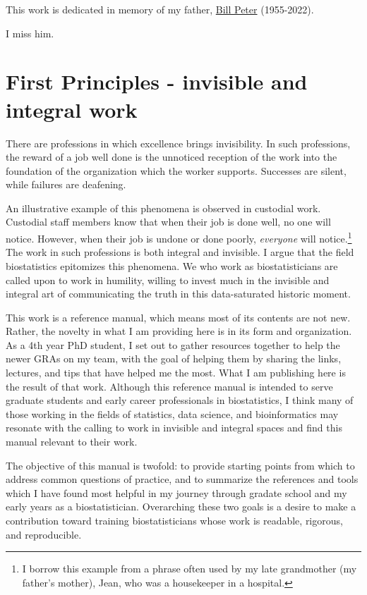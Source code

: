 \documentclass[
]{book}
\begin{document}
This work is dedicated in memory of my father, \href{https://www.hendersonvillefh.com/obituary/William-Peter}{Bill Peter} (1955-2022).

I miss him.

\hypertarget{first-principles---invisible-and-integral-work}{%
\chapter{First Principles - invisible and integral work}\label{first-principles---invisible-and-integral-work}}

There are professions in which excellence brings invisibility. In such professions, the reward of a job well done is the unnoticed reception of the work into the foundation of the organization which the worker supports. Successes are silent, while failures are deafening.

An illustrative example of this phenomena is observed in custodial work. Custodial staff members know that when their job is done well, no one will notice. However, when their job is undone or done poorly, \emph{everyone} will notice.\footnote{I borrow this example from a phrase often used by my late grandmother (my father's mother), Jean, who was a housekeeper in a hospital.} The work in such professions is both integral and invisible. I argue that the field biostatistics epitomizes this phenomena. We who work as biostatisticians are called upon to work in humility, willing to invest much in the invisible and integral art of communicating the truth in this data-saturated historic moment.

This work is a reference manual, which means most of its contents are not new. Rather, the novelty in what I am providing here is in its form and organization. As a 4th year PhD student, I set out to gather resources together to help the newer GRAs on my team, with the goal of helping them by sharing the links, lectures, and tips that have helped me the most. What I am publishing here is the result of that work. Although this reference manual is intended to serve graduate students and early career professionals in biostatistics, I think many of those working in the fields of statistics, data science, and bioinformatics may resonate with the calling to work in invisible and integral spaces and find this manual relevant to their work.

The objective of this manual is twofold: to provide starting points from which to address common questions of practice, and to summarize the references and tools which I have found most helpful in my journey through gradate school and my early years as a biostatistician. Overarching these two goals is a desire to make a contribution toward training biostatisticians whose work is readable, rigorous, and reproducible.
\end{document}
